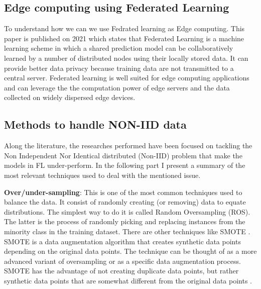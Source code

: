 \subsection{Edge computing using Federated Learning} \label{fedrated_learning_as_edge computing}

To understand how we can we use Fedrated learning as Edge computing. This paper \cite{fedrated_learning_as_edge_computing} is published on 2021 which states that Federated Learning is a machine learning scheme in which a shared prediction model can be collaboratively learned by a number of distributed nodes using their locally stored data. It can provide better data privacy because training data are not transmitted to a central server. Federated learning is well suited for edge computing applications and can leverage the the computation power of edge servers and the data collected on widely dispersed edge devices.




\subsection{Methods to handle NON-IID data} \label{non_iid_handling}

Along the literature, the researches performed have been focused on tackling the Non Independent Nor Identical distributed (Non-IID) problem that make the models in FL under-perform. In the following part I present a summary of the most relevant techniques used to deal with the mentioned issue.

\textbf{Over/under-sampling}: This is one of the most common techniques used to balance the data. It consist of randomly creating (or removing) data to equate distributions. The simplest way to do it is called Random Oversampling (ROS). The latter is the process of randomly picking and replacing instances from the minority class in the training dataset. There are other techniques like SMOTE \cite{metrics_ecg1}. SMOTE is a data augmentation algorithm that creates synthetic data points depending on the original data points. The technique can be thought of as a more advanced variant of oversampling or as a specific data augmentation process. SMOTE has the advantage of not creating duplicate data points, but rather synthetic data points that are somewhat different from the original data points \cite{imbalance_data3}.

